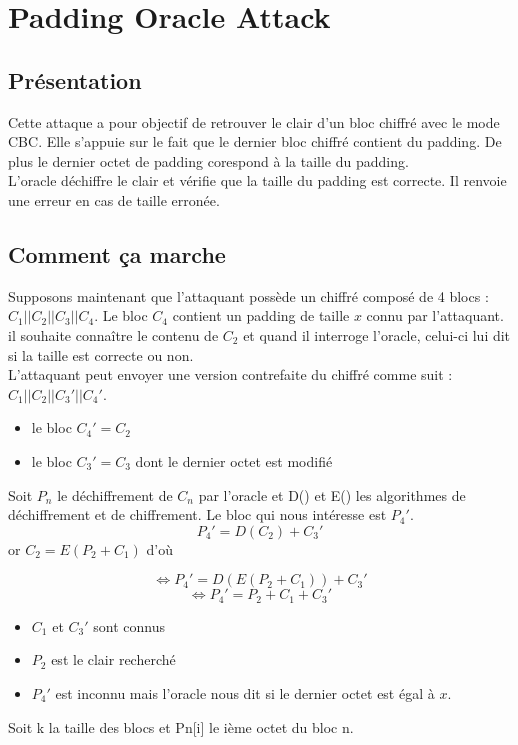 
\chapter{Padding Oracle Attack}
\label{chapter:poa}

\section{Présentation}
\label{sec:pPOA}

Cette attaque a pour objectif de retrouver le clair d'un bloc chiffré 
avec le mode CBC\up{\ref{fig:cbc}}. Elle s'appuie sur le fait que le dernier bloc chiffré
contient du padding. De plus le dernier octet de padding corespond à la
taille du padding.\\
L'oracle  déchiffre le clair et vérifie que la taille du padding est correcte. 
Il renvoie une erreur en cas de taille erronée.\\

\section{Comment ça marche}
\label{sec:ccmPOA}

Supposons maintenant que l'attaquant possède un chiffré composé de 4 blocs :
$C_1||C_2||C_3||C_4$. Le bloc $C_4$ contient un padding de taille $x$ connu par l'attaquant.
il souhaite connaître le contenu de $C_2$ et quand il interroge l'oracle, celui-ci lui dit
si la taille est correcte ou non.\\
L'attaquant peut envoyer une version contrefaite du chiffré comme suit :
$C_1||C_2||C_3'||C_4'$.\\
\begin{itemize}
\item le bloc $C_4'=C_2$
\item le bloc $C_3'= C_3$ dont le dernier octet est modifié
\end{itemize}
Soit $P_n$ le déchiffrement de $C_n$ par l'oracle et D() et E() les algorithmes
de déchiffrement et de chiffrement. 
Le bloc qui nous intéresse est $P_4'$.
\[P_4' = D(C_2) + C_3'\]
or $C_2 = E(P_2 + C_1)$ d'où

\[\Longleftrightarrow P_4' = D(E(P_2 + C_1)) + C_3'\]
\[\Longleftrightarrow P_4' = P_2 + C_1 + C_3'\]
\begin{itemize}
\item $C_1$ et $C_3'$ sont connus
\item $P_2$ est le clair recherché
\item $P_4'$ est inconnu mais l'oracle nous dit si le dernier octet est égal à $x$.
\end{itemize}
Soit k la taille des blocs et Pn[i] le ième octet du bloc n.

